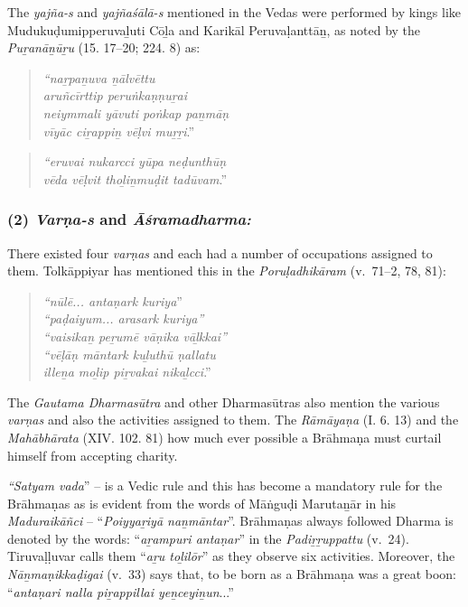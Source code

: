 \vskip -9pt

The \textit{yajña-s} and \textit{yajñaśālā-s} mentioned in the Vedas were performed by kings like Mudukuḍumipperuvaḻuti Cōḻa and Karikāl Peruvaḷanttāṉ, as noted by the \textit{Puṟanāṉūṟu} (15. 17–20; 224. 8) as:

\begin{quote}
\textit{“naṟpaṉuva ṉālvēttu}\\\textit{aruñcīrttip peruṅkaṇṇuṟai}\\\textit{neiymmali yāvuti poṅkap paṉmāṇ}\\\textit{vīyāc ciṟappiṉ vēḷvi muṟṟi}.”
\end{quote}

\begin{quote}
\textit{“eruvai nukarcci yūpa neḍunthūṇ}\\\textit{vēda vēḷvit thoḻiṉmuḍit tadūvam}.”
\end{quote}


\subsubsection*{(2) \textit{Varṇa-s} and \textit{Āśramadharma:}}

\vskip -7pt

There existed four \textit{varṇas} and each had a number of occupations assigned to them. Tolkāppiyar has mentioned this in the \textit{Poruḷadhikāram} (v.~71–2, 78, 81):

\begin{quote}
\textit{“nūlē... antaṇark kuriya}”\\\textit{“paḍaiyum... arasark kuriya”}\\\textit{“vaisikaṉ peṟumē vāṇika vāḻkkai”}\\\textit{“vēḷāṇ māntark kuḻuthū ṇallatu}\\\textit{illeṉa moḻip piṟvakai nikaḻcci}.”
\end{quote}

The \textit{Gautama Dharmasūtra} and other Dharmasūtras also mention the various \textit{varṇas} and also the activities assigned to them. The \textit{Rāmāyaṇa} (I. 6. 13) and the \textit{Mahābhārata} (XIV. 102. 81) how much ever possible a Brāhmaṇa must curtail himself from accepting charity.

\textit{“Satyam vada}” – is a Vedic rule and this has become a mandatory rule for the Brāhmaṇas as is evident from the words of Māṅguḍi Marutaṉār in his \textit{Maduraikāñci} – “\textit{Poiyyaṟiyā naṉmāntar}”. Brāhmaṇas always followed Dharma is denoted by the words: “\textit{aṟampuri antaṇar}” in the \textit{Padiṟṟuppattu} (v.~24). Tiruvaḷḷuvar calls them “\textit{aṟu toḻilōr}” as they observe six activities. Moreover, the \textit{Nāṉmaṇikkaḍigai} (v.~33) says that, to be born as a Brāhmaṇa was a great boon: “\textit{antaṇari nalla piṟappillai yeṉceyiṉun}...”

